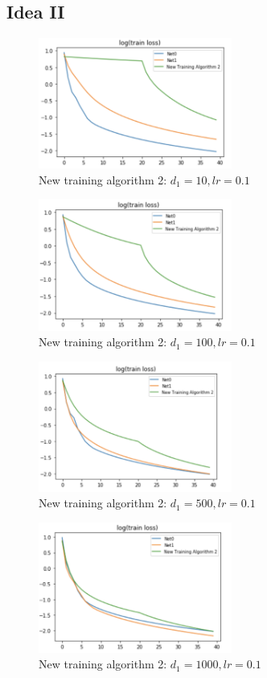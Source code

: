 \subsection{Idea II}
\begin{figure}[H]
	\centering
	\includegraphics[width=2.5in]{figure/train2_hidden10.png}
	\caption{New training algorithm 2: $d_1 = 10, lr = 0.1$}
\end{figure}
\begin{figure}[H]
	\centering
	\includegraphics[width=2.5in]{figure/train2_hidden100.png}
	\caption{New training algorithm 2: $d_1 = 100, lr = 0.1$}
\end{figure}
\begin{figure}[H]
	\centering
	\includegraphics[width=2.5in]{figure/train2_hidden500.png}
	\caption{New training algorithm 2: $d_1 = 500, lr = 0.1$}
\end{figure}
\begin{figure}[H]
	\centering
	\includegraphics[width=2.5in]{figure/train2_hidden1000.png}
	\caption{New training algorithm 2: $d_1 = 1000, lr = 0.1$}
\end{figure}
